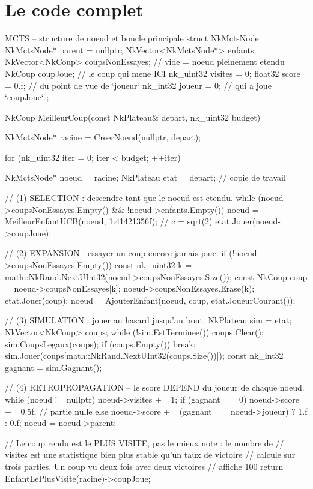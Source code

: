 \section{Le code complet}

\begin{nkcode}{MCTS -- structure de noeud et boucle principale}
struct NkMctsNode {
        NkMctsNode* parent = nullptr;
        NkVector<NkMctsNode*> enfants;
        NkVector<NkCoup> coupsNonEssayes;  // vide = noeud pleinement etendu
        NkCoup coupJoue;                    // le coup qui mene ICI
        nk_uint32 visites = 0;
        float32 score = 0.f;                // du point de vue de `joueur`
        nk_int32 joueur = 0;                // qui a joue `coupJoue`
};

NkCoup MeilleurCoup(const NkPlateau& depart, nk_uint32 budget) {
    NkMctsNode* racine = CreerNoeud(nullptr, depart);

    for (nk_uint32 iter = 0; iter < budget; ++iter) {
        NkMctsNode* noeud = racine;
        NkPlateau etat = depart;             // copie de travail

        // (1) SELECTION : descendre tant que le noeud est etendu.
        while (noeud->coupsNonEssayes.Empty() && !noeud->enfants.Empty()) {
            noeud = MeilleurEnfantUCB(noeud, 1.41421356f);   // c = sqrt(2)
            etat.Jouer(noeud->coupJoue);
        }

        // (2) EXPANSION : essayer un coup encore jamais joue.
        if (!noeud->coupsNonEssayes.Empty()) {
            const nk_uint32 k =
                math::NkRand.NextUInt32(noeud->coupsNonEssayes.Size());
            const NkCoup coup = noeud->coupsNonEssayes[k];
            noeud->coupsNonEssayes.Erase(k);
            etat.Jouer(coup);
            noeud = AjouterEnfant(noeud, coup, etat.JoueurCourant());
        }

        // (3) SIMULATION : jouer au hasard jusqu'au bout.
        NkPlateau sim = etat;
        NkVector<NkCoup> coups;
        while (!sim.EstTerminee()) {
            coups.Clear();
            sim.CoupsLegaux(coups);
            if (coups.Empty())
                break;
            sim.Jouer(coups[math::NkRand.NextUInt32(coups.Size())]);
        }
        const nk_int32 gagnant = sim.Gagnant();

        // (4) RETROPROPAGATION -- le score DEPEND du joueur de chaque noeud.
        while (noeud != nullptr) {
            noeud->visites += 1;
            if (gagnant == 0)
                noeud->score += 0.5f;                        // partie nulle
            else
                noeud->score += (gagnant == noeud->joueur) ? 1.f : 0.f;
            noeud = noeud->parent;
        }
    }

    // Le coup rendu est le PLUS VISITE, pas le mieux note : le nombre de
    // visites est une statistique bien plus stable qu'un taux de victoire
    // calcule sur trois parties. Un coup vu deux fois avec deux victoires
    // affiche 100 %
    return EnfantLePlusVisite(racine)->coupJoue;
}
\end{nkcode}

